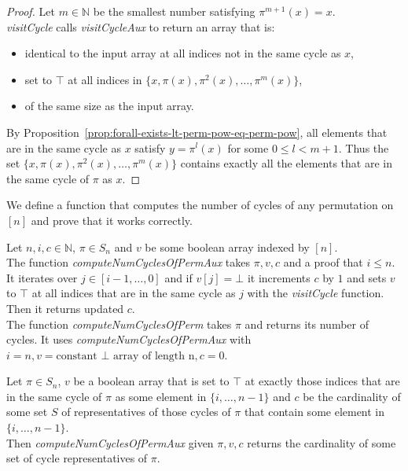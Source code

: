 \begin{proof}
  \leanok
  Let $m \in \mathbb{N}$ be the smallest number satisfying $\pi^{m + 1}(x) = x$.\\
  \emph{visitCycle} calls \emph{visitCycleAux} to return an array that is:
  \begin{itemize}
    \item identical to the input array at all indices not in the same cycle as $x$,
    \item set to $\top$ at all indices in $\{x, \pi(x), \pi^2(x), \dots, \pi^m(x)\}$,
    \item of the same size as the input array.
  \end{itemize}
  By Proposition~\ref{prop:forall-exists-lt-perm-pow-eq-perm-pow}, all elements that are in the same cycle as $x$ satisfy $y = \pi^l(x)$ for some $0 \leq l < m + 1$. Thus the set $\{x, \pi(x), \pi^2(x), \dots, \pi^m(x)\}$ contains exactly all the elements that are in the same cycle of $\pi$ as $x$.
\end{proof}

We define a function that computes the number of cycles of any permutation on $[n]$ and prove that it works correctly.

\begin{definition}
  \label{def:computeNumCyclesOfPerm}
  \leanok
  Let $n, i, c \in \mathbb{N}$, $\pi \in S_n$ and $v$ be some boolean array indexed by $[n]$.\\
  The function \emph{computeNumCyclesOfPermAux} takes $\pi, v, c$ and a proof that $i \leq n$. It iterates over $j \in [i - 1, \dots, 0]$ and if $v[j] = \bot$ it increments $c$ by $1$ and sets $v$ to $\top$ at all indices that are in the same cycle as $j$ with the \emph{visitCycle} function. Then it returns updated $c$.\\
  The function \emph{computeNumCyclesOfPerm} takes $\pi$ and returns its number of cycles. It uses \emph{computeNumCyclesOfPermAux} with $i = n, v = \text{constant }\bot\text{ array of length n}, c = 0$.
\end{definition}

\begin{proposition}
  \label{prop:computeNumCyclesOfPermAux-exists-representatives}
  \leanok
  Let $\pi \in S_n$, $v$ be a boolean array that is set to $\top$ at exactly those indices that are in the same cycle of $\pi$ as some element in $\{i, \dots, n - 1\}$ and $c$ be the cardinality of some set $S$ of representatives of those cycles of $\pi$ that contain some element in $\{i, \dots, n - 1\}$.\\
  Then \emph{computeNumCyclesOfPermAux} given $\pi, v, c$ returns the cardinality of some set of cycle representatives of $\pi$.
\end{proposition}


